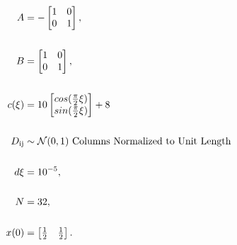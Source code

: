 \begin{enumerate}
\begin{align}
\label{eq:analysis:comparison_sc_vs_pcf_vs_gj:pcf_demo_sim_params}
A &= -\begin{bmatrix}  
1 & 0 \\
0 & 1
\end{bmatrix},\notag \\
\notag \\
B &= \begin{bmatrix}  
1 & 0 \\
0 & 1
\end{bmatrix}, \notag \\
\notag \\
c(\xi) &= 10 \begin{bmatrix} 
cos(\frac{\pi}{2} \xi)\\
sin(\frac{\pi}{2} \xi)
\end{bmatrix} + 8 \\
\notag \\
D_{\text{ij}} &\sim  \mathcal{N} (0, 1) \text{ Columns Normalized to Unit Length} \notag \\
\notag \\
d\xi &= 10^{-5}, \notag \\
\notag \\
N &= 32,\notag \\
\notag \\
x(0) &= \begin{bmatrix} \frac{1}{2} & \frac{1}{2} \end{bmatrix}.\notag 
\end{align}\\




\end{enumerate}
